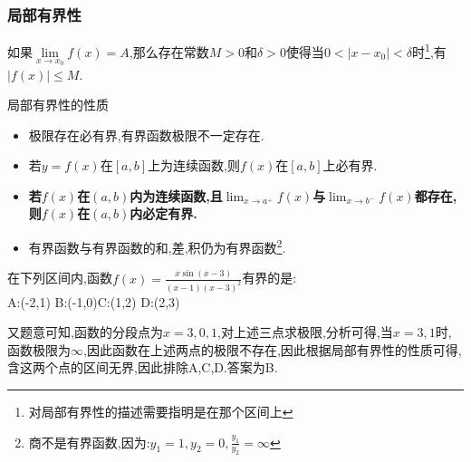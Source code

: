 \documentclass[12pt, a4paper, oneside, UTF8]{ctexbook}  %
\begin{document}
\begin{sloppypar}
    \subsubsection{局部有界性}
    \begin{them}{}{}
        如果$\lim\limits_{x\to x_0}f(x)=A$,那么存在常数$M>0$和$\delta >0$使得当$0<|x-x_0|<\delta$时\footnote{对局部有界性的描述需要指明是在那个区间上},有$|f(x)| \leq M$.
    \end{them}
    \begin{criterion}{局部有界性的性质}{}
        \begin{itemize}
            \item 极限存在必有界,有界函数极限不一定存在.
            \item 若$y=f(x)$在$[a,b]$上为连续函数,则$f(x)$在$[a,b]$上必有界.
            \item \textbf{若$f(x)$在$(a,b)$内为连续函数,且$\lim_{x \to a^+}f(x)$与$\lim_{x\to b^-}f(x)$都存在,则$f(x)$在$(a,b)$内必定有界.}
            \item 有界函数与有界函数的和,差,积仍为有界函数\footnote{商不是有界函数,因为:$y_1=1,y_2=0,\frac{y_1}{y_2}=\infty$}.
        \end{itemize}
    \end{criterion}
    \begin{problem}
    在下列区间内,函数$f(x)={\frac{x\sin(x-3)}{(x-1)(x-3)^{2}}}$有界的是:\\
    A:(-2,1) \qquad  B:(-1,0)\qquad C:(1,2) \qquad D:(2,3)
    \end{problem}
    \begin{solution}
        又题意可知,函数的分段点为$x=3,0,1$,对上述三点求极限,分析可得,当$x=3,1$时,函数极限为$\infty$,因此函数在上述两点的极限不存在,因此根据局部有界性的性质可得,含这两个点的区间无界,因此排除A,C,D.答案为B.
    \end{solution}

\end{sloppypar}
\end{document}

